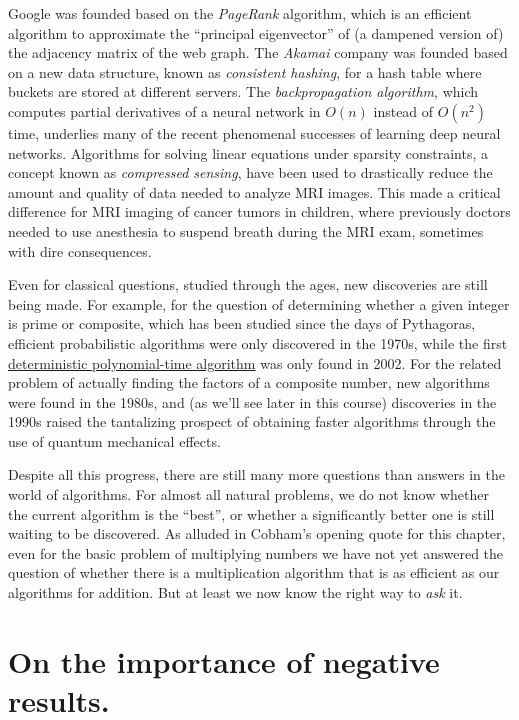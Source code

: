 Google was founded based on the \emph{PageRank} algorithm, which is an
efficient algorithm to approximate the ``principal eigenvector'' of (a
dampened version of) the adjacency matrix of the web graph. The
\emph{Akamai} company was founded based on a new data structure, known
as \emph{consistent hashing}, for a hash table where buckets are stored
at different servers. The \emph{backpropagation algorithm}, which
computes partial derivatives of a neural network in \(O(n)\) instead of
\(O(n^2)\) time, underlies many of the recent phenomenal successes of
learning deep neural networks. Algorithms for solving linear equations
under sparsity constraints, a concept known as \emph{compressed
sensing}, have been used to drastically reduce the amount and quality of
data needed to analyze MRI images. This made a critical difference for
MRI imaging of cancer tumors in children, where previously doctors
needed to use anesthesia to suspend breath during the MRI exam,
sometimes with dire consequences.

Even for classical questions, studied through the ages, new discoveries
are still being made. For example, for the question of determining
whether a given integer is prime or composite, which has been studied
since the days of Pythagoras, efficient probabilistic algorithms were
only discovered in the 1970s, while the first
\href{https://en.wikipedia.org/wiki/AKS_primality_test}{deterministic
polynomial-time algorithm} was only found in 2002. For the related
problem of actually finding the factors of a composite number, new
algorithms were found in the 1980s, and (as we'll see later in this
course) discoveries in the 1990s raised the tantalizing prospect of
obtaining faster algorithms through the use of quantum mechanical
effects.

Despite all this progress, there are still many more questions than
answers in the world of algorithms. For almost all natural problems, we
do not know whether the current algorithm is the ``best'', or whether a
significantly better one is still waiting to be discovered. As alluded
in Cobham's opening quote for this chapter, even for the basic problem
of multiplying numbers we have not yet answered the question of whether
there is a multiplication algorithm that is as efficient as our
algorithms for addition. But at least we now know the right way to
\emph{ask} it.

\section{On the importance of negative
results.}\label{On-the-importance-of-nega}

